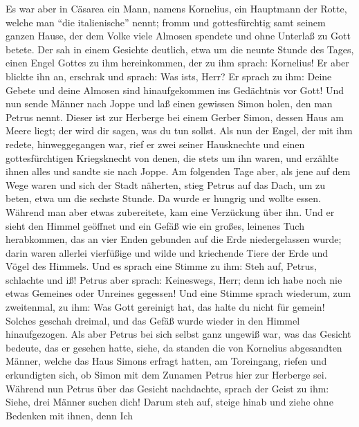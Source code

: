  Es war aber in Cäsarea ein Mann, namens Kornelius, ein
Hauptmann der Rotte, welche man ``die italienische'' nennt;
 fromm und gottesfürchtig samt seinem ganzen Hause, der
dem Volke viele Almosen spendete und ohne Unterlaß zu Gott betete.
 Der sah in einem Gesichte deutlich, etwa um die neunte
Stunde des Tages, einen Engel Gottes zu ihm hereinkommen, der zu ihm
sprach: Kornelius!  Er aber blickte ihn an, erschrak und
sprach: Was ist\textquotesingle s, Herr? Er sprach zu ihm: Deine Gebete
und deine Almosen sind hinaufgekommen ins Gedächtnis vor Gott!
 Und nun sende Männer nach Joppe und laß einen gewissen
Simon holen, den man Petrus nennt.  Dieser ist zur
Herberge bei einem Gerber Simon, dessen Haus am Meere liegt; der wird
dir sagen, was du tun sollst.  Als nun der Engel, der mit
ihm redete, hinweggegangen war, rief er zwei seiner Hausknechte und
einen gottesfürchtigen Kriegsknecht von denen, die stets um ihn waren,
 und erzählte ihnen alles und sandte sie nach Joppe.
 Am folgenden Tage aber, als jene auf dem Wege waren und
sich der Stadt näherten, stieg Petrus auf das Dach, um zu beten, etwa um
die sechste Stunde.  Da wurde er hungrig und wollte
essen. Während man aber etwas zubereitete, kam eine Verzückung über ihn.
 Und er sieht den Himmel geöffnet und ein Gefäß wie ein
großes, leinenes Tuch herabkommen, das an vier Enden gebunden auf die
Erde niedergelassen wurde;  darin waren allerlei
vierfüßige und wilde und kriechende Tiere der Erde und Vögel des
Himmels.  Und es sprach eine Stimme zu ihm: Steh auf,
Petrus, schlachte und iß!  Petrus aber sprach:
Keineswegs, Herr; denn ich habe noch nie etwas Gemeines oder Unreines
gegessen!  Und eine Stimme sprach wiederum, zum
zweitenmal, zu ihm: Was Gott gereinigt hat, das halte du nicht für
gemein!  Solches geschah dreimal, und das Gefäß wurde
wieder in den Himmel hinaufgezogen.  Als aber Petrus bei
sich selbst ganz ungewiß war, was das Gesicht bedeute, das er gesehen
hatte, siehe, da standen die von Kornelius abgesandten Männer, welche
das Haus Simons erfragt hatten, am Toreingang,  riefen
und erkundigten sich, ob Simon mit dem Zunamen Petrus hier zur Herberge
sei.  Während nun Petrus über das Gesicht nachdachte,
sprach der Geist zu ihm: Siehe, drei Männer suchen dich! 
Darum steh auf, steige hinab und ziehe ohne Bedenken mit ihnen, denn Ich
